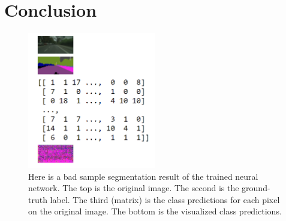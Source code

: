\documentclass[10pt,twocolumn,letterpaper]{article}
\begin{document}
\section{Conclusion}

\begin{figure}[t]
	\centering
	\includegraphics[width=0.50\textwidth]{bad_result.PNG}
	\caption{Here is a bad sample segmentation result of the trained neural network. The top is the original image. The second is the ground-truth label. The third (matrix) is the class predictions for each pixel on the original image. The bottom is the visualized class predictions.}
	\label{fig:leadfigure}
\end{figure}


{\small


}
\end{document}
